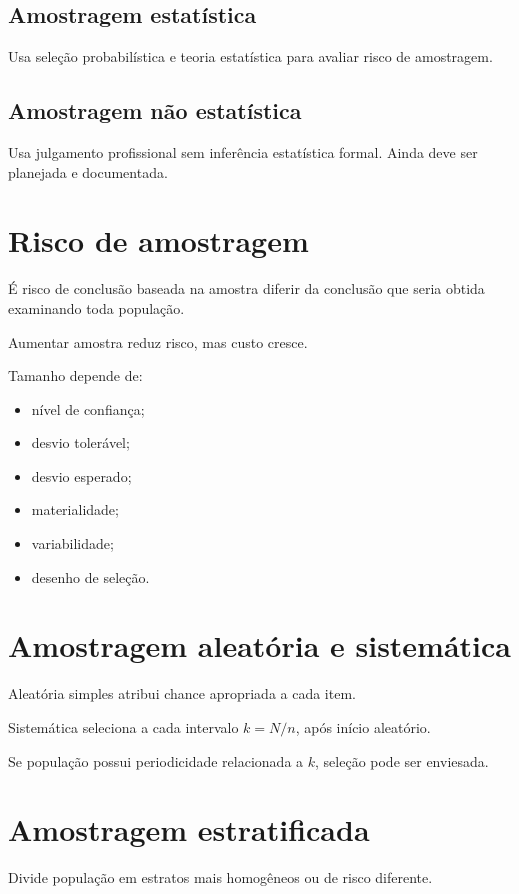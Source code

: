 \subsection{Amostragem estatística}

Usa seleção probabilística e teoria estatística para avaliar risco de amostragem.

\subsection{Amostragem não estatística}

Usa julgamento profissional sem inferência estatística formal. Ainda deve ser planejada e documentada.

\section{Risco de amostragem}

É risco de conclusão baseada na amostra diferir da conclusão que seria obtida examinando toda população.

Aumentar amostra reduz risco, mas custo cresce.

Tamanho depende de:
\begin{itemize}
\item nível de confiança;
\item desvio tolerável;
\item desvio esperado;
\item materialidade;
\item variabilidade;
\item desenho de seleção.
\end{itemize}

\section{Amostragem aleatória e sistemática}

Aleatória simples atribui chance apropriada a cada item.

Sistemática seleciona a cada intervalo $k=N/n$, após início aleatório.

Se população possui periodicidade relacionada a $k$, seleção pode ser enviesada.

\section{Amostragem estratificada}

Divide população em estratos mais homogêneos ou de risco diferente.

